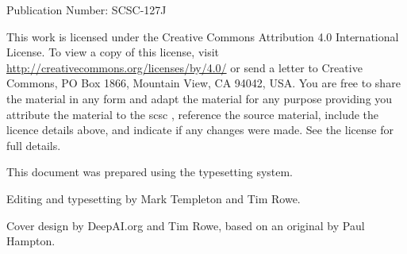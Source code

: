 %
%

%
%

\pagestyle{FirstPageFrontCover}
%
%



 Publication Number: SCSC-127J

This work is licensed under the Creative Commons Attribution 4.0 International License. To view a copy of this license, visit \href{http://creativecommons.org/licenses/by/4.0/}{http://creativecommons.org/licenses/by/4.0/} or send a letter to Creative Commons, PO Box 1866, Mountain View, CA 94042, USA\@. You are free to share the material in any form and adapt the material for any purpose providing you attribute the material to the \gls{scsc} , reference the source material, include the licence details above, and indicate if any changes were made.  See the license for full details.

This document was prepared using the \LaTeXe\/ typesetting system.

Editing and typesetting by Mark Templeton and Tim Rowe.

Cover design by DeepAI.org and Tim Rowe, based on an original by Paul Hampton.


\clearpage
\pagestyle{ContinuationInsideFrontCover}


